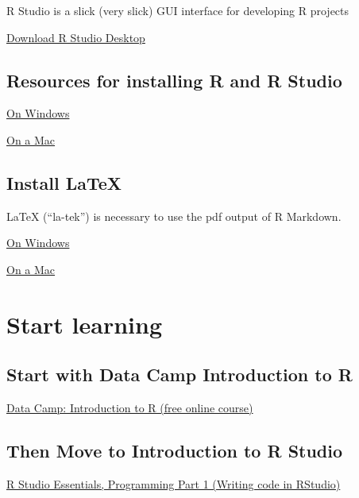 \documentclass[]{book}
\theoremstyle{definition}
\theoremstyle{definition}
\theoremstyle{definition}
\theoremstyle{remark}
\begin{document}
R Studio is a slick (very slick) GUI interface for developing R projects

\href{https://www.rstudio.com/products/rstudio/download/}{Download R
Studio Desktop}

\subsection{Resources for installing R and R
Studio}\label{resources-for-installing-r-and-r-studio}

\href{https://medium.com/@GalarnykMichael/install-r-and-rstudio-on-windows-5f503f708027}{On
Windows}

\href{https://medium.com/@GalarnykMichael/install-r-and-rstudio-on-mac-e911606ce4f4}{On
a Mac}

\subsection{Install LaTeX}\label{install-latex}

LaTeX (``la-tek'') is necessary to use the pdf output of R Markdown.

\href{https://medium.com/@sorenlind/create-pdf-reports-using-r-r-markdown-latex-and-knitr-on-windows-10-952b0c48bfa9}{On
Windows}

\href{https://medium.com/@sorenlind/create-pdf-reports-using-r-r-markdown-latex-and-knitr-on-macos-high-sierra-e7b5705c9fd}{On
a Mac}

\section{Start learning}\label{start-learning}

\subsection{Start with Data Camp Introduction to
R}\label{start-with-data-camp-introduction-to-r}

\href{https://www.datacamp.com/courses/free-introduction-to-r}{Data
Camp: Introduction to R (free online course)}

\subsection{Then Move to Introduction to R
Studio}\label{then-move-to-introduction-to-r-studio}

\href{https://www.rstudio.com/resources/webinars/rstudio-essentials-webinar-series-part-1/}{R
Studio Essentials, Programming Part 1 (Writing code in RStudio)}
\end{document}
